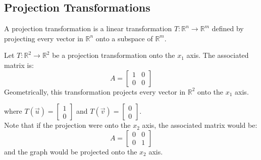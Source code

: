 \subsection{Projection Transformations}
\begin{definition}
    A projection transformation is a linear transformation $T: \mathbb{R}^n \to \mathbb{R}^m$ defined by projecting every vector in $\mathbb{R}^n$ onto a subspace of $\mathbb{R}^m$.
\end{definition}
\begin{eg}
    Let $T: \mathbb{R}^2 \to \mathbb{R}^2$ be a projection transformation onto the $x_1$ axis. The associated matrix is:
    \[
        A = \begin{bmatrix} 1 & 0 \\ 0 & 0 \end{bmatrix}
    \]
    Geometrically, this transformation projects every vector in $\mathbb{R}^2$ onto the $x_1$ axis.
    \begin{center}
    \end{center}
    where $T(\vec{u}) = \begin{bmatrix} 1 \\ 0 \end{bmatrix}$ and $T(\vec{v}) = \begin{bmatrix} 0 \\ 0 \end{bmatrix}$. \\
    Note that if the projection were onto the $x_2$ axis, the associated matrix would be:
    \[
        A = \begin{bmatrix} 0 & 0 \\ 0 & 1 \end{bmatrix}
    \]
    and the graph would be projected onto the $x_2$ axis.
\end{eg}

